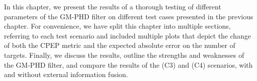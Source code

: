 
In this chapter, we present the results of a thorough testing of different parameters of the GM-PHD filter on different test cases presented in the previous chapter. For convenience, we have split this chapter into multiple sections, referring to each test scenario and included multiple plots that depict the change of both the CPEP metric and the expected absolute error on the number of targets. Finally, we discuss the results, outline the strengths and weaknesses of the GM-PHD filter, and compare the results of the (C3) and (C4) scenarios, with and without external information fusion.
